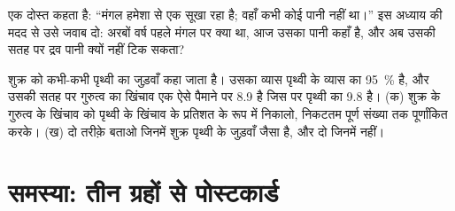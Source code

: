 \begin{exercise}[$\star\star\star$]\label{exo:g6:earth-a-planet:11}
एक दोस्त कहता है: ``मंगल हमेशा से एक सूखा  रहा है; वहाँ कभी कोई पानी नहीं
था।'' इस अध्याय की मदद से उसे जवाब दो: अरबों वर्ष पहले मंगल पर क्या था, आज उसका
पानी कहाँ है, और अब उसकी सतह पर द्रव पानी क्यों
नहीं टिक सकता?
\end{exercise}

\begin{exercise}[$\star\star\star$]\label{exo:g6:earth-a-planet:12}
शुक्र को कभी-कभी पृथ्वी का जुड़वाँ कहा जाता है। उसका व्यास पृथ्वी के व्यास का 95~\%
है, और उसकी सतह पर गुरुत्व का खिंचाव एक ऐसे पैमाने पर 8.9 है जिस पर
पृथ्वी का 9.8 है। (क) शुक्र के गुरुत्व के खिंचाव को पृथ्वी के खिंचाव के प्रतिशत के रूप
में निकालो,
निकटतम पूर्ण संख्या तक पूर्णांकित करके। (ख) दो तरीक़े बताओ जिनमें शुक्र पृथ्वी के
जुड़वाँ जैसा है, और दो जिनमें नहीं।
\end{exercise}

\section{समस्या: तीन ग्रहों से पोस्टकार्ड}

